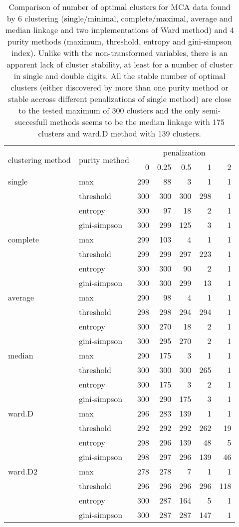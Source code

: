\documentclass[12pt, a4paper]{article}
\begin{document}
\begin{table}
    \centering
    \begin{tabular}{llrrrrr}
    \toprule
    \multirow{2}{*}[-2pt]{clustering method} & \multirow{2}{*}[-2pt]{purity method} & \multicolumn{5}{c}{penalization}\\ \cmidrule(l){3-7}
    & & 0 & 0.25 & 0.5 & 1 & 2 \\ \midrule
    single & max & 299 & 88 & 3 & 1 & 1\\
     & threshold & 300 & 300 & 300 & 298 & 1\\
     & entropy & 300 & 97 & 18 & 2 & 1\\
     & gini-simpson & 300 & 299 & 125 & 3 & 1\\[1em]
    complete & max & 299 & 103 & 4 & 1 & 1\\
     & threshold & 299 & 299 & 297 & 223 & 1\\
     & entropy & 300 & 300 & 90 & 2 & 1\\
     & gini-simpson & 300 & 300 & 299 & 13 & 1\\[1em]
    average & max & 290 & 98 & 4 & 1 & 1\\
     & threshold & 298 & 298 & 294 & 294 & 1\\
     & entropy & 300 & 270 & 18 & 2 & 1\\
     & gini-simpson & 300 & 295 & 270 & 2 & 1\\[1em]
    median & max & 290 & 175 & 3 & 1 & 1\\
     & threshold & 300 & 300 & 300 & 265 & 1\\
     & entropy & 300 & 175 & 3 & 2 & 1\\
     & gini-simpson & 300 & 290 & 175 & 3 & 1\\[1em]
    ward.D & max & 296 & 283 & 139 & 1 & 1\\
     & threshold & 292 & 292 & 292 & 262 & 19\\
     & entropy & 298 & 296 & 139 & 48 & 5\\
     & gini-simpson & 298 & 297 & 296 & 139 & 46\\[1em]
    ward.D2 & max & 278 & 278 & 7 & 1 & 1\\
     & threshold & 296 & 296 & 296 & 296 & 118\\
     & entropy & 300 & 287 & 164 & 5 & 1\\
     & gini-simpson & 300 & 287 & 287 & 147 & 1\\
  \bottomrule
    \end{tabular}
    \caption{Comparison of number of optimal clusters for MCA data found by 6 clustering (single/minimal, complete/maximal, average and median linkage and two implementations of Ward method) and 4 purity methods (maximum, threshold, entropy and gini-simpson index). Unlike with the non-transformed variables, there is an apparent lack of cluster stability, at least for a number of cluster in single and double digits. All the stable number of optimal clusters (either discovered by more than one purity method or stable accross different penalizations of single method) are close to the tested maximum of 300 clusters and the only semi-succesfull methods seems to be the median linkage with 175 clusters and ward.D method with 139 clusters.}

\end{table}
\end{document}
